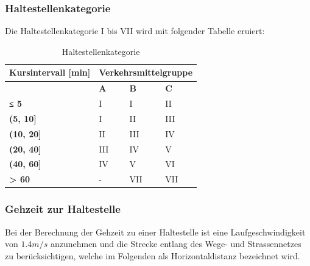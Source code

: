 \subsubsection{Haltestellenkategorie}
\label{Berechnungsmethodik OeVGK18:Haltestellenkategorie}
Die Haltestellenkategorie I bis VII wird mit folgender Tabelle eruiert:

\begin{table}[H]
    \begin{tabular}[c]{l p{4.0cm} p{4.0cm} p{4.0cm}}
        \toprule
        \textbf{Kursintervall [min]}
                                & \multicolumn{3}{c}{\textbf{Verkehrsmittelgruppe}}\\
        \midrule
        \textbf{}
                                & \textbf{A}
                                & \textbf{B}
                                & \textbf{C}\\
        \textbf{≤ 5}
                                & I
                                & I
                                & II\\
        \textbf{(5, 10]}
                                & I
                                & II
                                & III\\
        \textbf{(10, 20]}
                                & II
                                & III
                                & IV\\
        \textbf{(20, 40]}
                                & III
                                & IV
                                & V\\
        \textbf{(40, 60]}
                                & IV
                                & V
                                & VI\\
        \textbf{> 60}
                                & -
                                & VII
                                & VII\\
        \bottomrule
    \end{tabular}
    \caption{Haltestellenkategorie}
    \label{Haltestellenkategorie}
\end{table}

\subsubsection{Gehzeit zur Haltestelle}
\label{Berechnungsmethodik OeVGK18:Gehzeit zur Haltestelle}
Bei der Berechnung der Gehzeit zu einer Haltestelle ist eine Laufgeschwindigkeit von $1.4 m/s$ anzunehmen und die Strecke entlang des Wege- und Strassennetzes zu berücksichtigen, welche im Folgenden als Horizontaldistanz bezeichnet wird.


